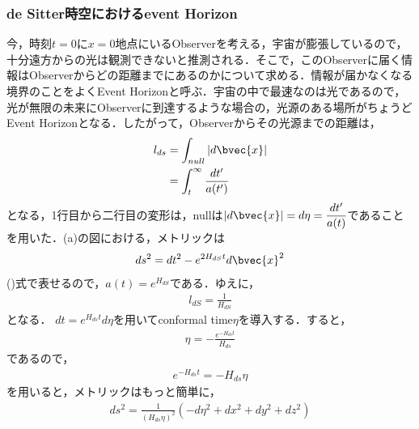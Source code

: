 \subsubsection{de Sitter時空におけるevent Horizon}
今，時刻$t=0$に$x=0$地点にいるObserverを考える，宇宙が膨張しているので，十分遠方からの光は観測できないと推測される．そこで，このObserverに届く情報はObserverからどの距離までにあるのかについて求める．情報が届かなくなる境界のことをよくEvent Horizonと呼ぶ．宇宙の中で最速なのは光であるので，光が無限の未来にObserverに到達するような場合の，光源のある場所がちょうどEvent Horizonとなる．したがって，Observerからその光源までの距離は，
\begin{align}
  l_{ds}&=\int_{null}|d\bvec{x}|\\
  &=\int^{\infty}_{t}\frac{dt^{\prime}}{a(t^{\prime})}
\end{align}
となる，1行目から二行目の変形は，nullは$|d\bvec{x}|=d\eta=\dfrac{dt^{\prime}}{a(t)}$であることを用いた．(a)の図における，メトリックは
\begin{align}
ds^2=dt^2-e^{2H_{dS}t}d\bvec{x}^2
\end{align}
()式で表せるので，$a(t)=e^{H_{dS}}$である．ゆえに，
\begin{align}
l_{dS}=\frac{1}{H_{dS}}
\end{align}
となる．
$dt=e^{H_{ds}t}d\eta$を用いてconformal time$\eta$を導入する．すると，
\begin{align}
\eta=-\frac{e^{-H_{ds}t}}{H_{ds}}
\end{align}
であるので，
\begin{align}
e^{-H_{ds}t}=-H_{ds}\eta
\end{align}
を用いると，メトリックはもっと簡単に，
\begin{align}
ds^2=\frac{1}{(H_{ds}\eta)^2}(-d\eta^2+dx^2+dy^2+dz^2)
\end{align}

